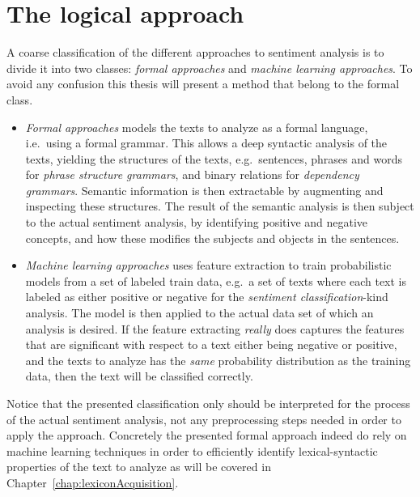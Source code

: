 \section{The logical approach}
\label{sec:logicalApproach}
A coarse classification of the different approaches to sentiment analysis is to divide it into two classes: \emph{formal approaches} and \emph{machine learning approaches}. To avoid any confusion this thesis will present a method that belong to the formal class. 
\begin{itemize}
	\item \textit{Formal approaches} models the texts to analyze as a formal language, i.e.\ using a formal grammar. This allows a deep syntactic analysis of the texts, yielding the structures of the texts, e.g.\ sentences, phrases and words for \emph{phrase structure grammars}, and binary relations for \emph{dependency grammars}. Semantic information is then extractable by augmenting and inspecting these structures. The result of the semantic analysis is then subject to the actual sentiment analysis, by identifying positive and negative concepts, and how these modifies the subjects and objects in the sentences.

	\item \textit{Machine learning approaches} uses feature extraction to train probabilistic models from a set of labeled train data, e.g.\ a set of texts where each text is labeled as either positive or negative for the \emph{sentiment classification}-kind analysis. The model is then applied to the actual data set of which an analysis is desired. If the feature extracting \emph{really} does captures the features that are significant with respect to a text either being negative or positive, and the texts to analyze has the \emph{same} probability distribution as the training data, then the text will be classified correctly.
\end{itemize}

Notice that the presented classification only should be interpreted for the process of the actual sentiment analysis, not any preprocessing steps needed in order to apply the approach. Concretely the presented formal approach indeed do rely on machine learning techniques in order to efficiently identify lexical-syntactic properties of the text to analyze as will be covered in Chapter~\ref{chap:lexiconAcquisition}.

